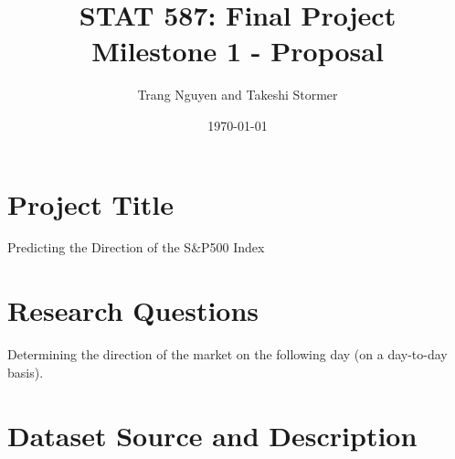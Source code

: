 \documentclass[11pt]{article}
\title{STAT 587: Final Project \\
Milestone 1 - Proposal}
\author{Trang Nguyen and Takeshi Stormer}
\date{\today}
\begin{document}
\maketitle
\thispagestyle{empty}       

\section{Project Title}
Predicting the Direction of the S\&P500 Index
\section{Research Questions}
Determining the direction of the market on the following day (on a day-to-day basis).
\section{Dataset Source and Description}
\end{document}
